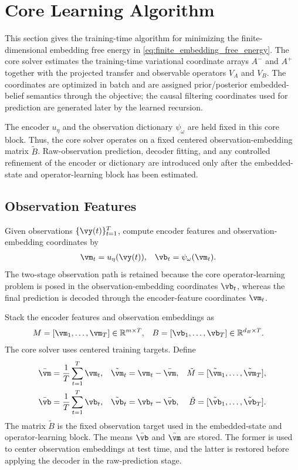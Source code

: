 \documentclass[twoside,11pt]{article}
\begin{document}
\section{Core Learning Algorithm}
\label{sec:core_learning_algorithm}

This section gives the training-time algorithm for minimizing the
finite-dimensional embedding free energy in
\eqref{eq:finite_embedding_free_energy}. The core solver estimates the
training-time variational coordinate arrays $A^-$ and $A^+$ together
with the projected transfer and observable operators $V_A$ and $V_B$.
The coordinates are optimized in batch and are assigned
prior/posterior embedded-belief semantics through the objective; the
causal filtering coordinates used for prediction are generated later by
the learned recursion.

The encoder $u_\eta$ and the observation dictionary $\psi_\omega$ are
held fixed in this core block. Thus, the core solver operates on a fixed
centered observation-embedding matrix $\tilde B$. Raw-observation
prediction, decoder fitting, and any controlled refinement of the
encoder or dictionary are introduced only after the embedded-state and
operator-learning block has been estimated.

\subsection{Observation Features}

Given observations $\{\vy(t)\}_{t=1}^T$, compute encoder features and
observation-embedding coordinates by
\begin{align}
\vm_t
&=
u_\eta(\vy(t)),
&
\vb_t
&=
\psi_\omega(\vm_t).
\label{eq:core_observation_features}
\end{align}
The two-stage observation path is retained because the core
operator-learning problem is posed in the observation-embedding
coordinates $\vb_t$, whereas the final prediction is decoded through
the encoder-feature coordinates $\vm_t$.

Stack the encoder features and observation embeddings as
\begin{align}
M
&=
[\vm_1,\dots,\vm_T]
\in\mathbb R^{m\times T},
&
B
&=
[\vb_1,\dots,\vb_T]
\in\mathbb R^{d_B\times T}.
\label{eq:core_M_B_matrices}
\end{align}
The core solver uses centered training targets. Define
\begin{align}
\bar{\vm}
&=
\frac1T\sum_{t=1}^T \vm_t,
&
\tilde{\vm}_t
&=
\vm_t-\bar{\vm},
&
\tilde M
&=
[\tilde{\vm}_1,\dots,\tilde{\vm}_T],
\label{eq:core_centered_M_matrix}
\\
\bar{\vb}
&=
\frac1T\sum_{t=1}^T \vb_t,
&
\tilde{\vb}_t
&=
\vb_t-\bar{\vb},
&
\tilde B
&=
[\tilde{\vb}_1,\dots,\tilde{\vb}_T].
\label{eq:core_centered_B_matrix}
\end{align}
The matrix $\tilde B$ is the fixed observation target used in the
embedded-state and operator-learning block. The means $\bar{\vb}$ and
$\bar{\vm}$ are stored. The former is used to center observation
embeddings at test time, and the latter is restored before applying the
decoder in the raw-prediction stage.
\end{document}
